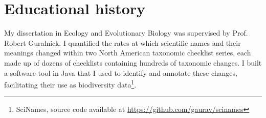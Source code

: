
\part{Educational history}


My dissertation in Ecology and Evolutionary Biology was supervised by Prof. Robert Guralnick. I quantified the rates at which scientific names and their meanings changed within two North American taxonomic checklist series, each made up of dozens of checklists containing hundreds of taxonomic changes. I built a software tool in Java that I used to identify and annotate these changes, facilitating their use as biodiversity data\footnote{SciNames, source code available at \url{https://github.com/gaurav/scinames}}.

